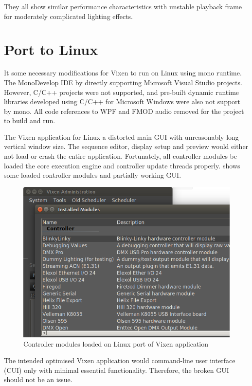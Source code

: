  They all show similar performance characteristics with unstable playback frame  for moderately complicated lighting effects.

\section{Port to Linux}

It  some necessary modifications for Vixen to run on Linux using  mono runtime. The MonoDevelop IDE \cite{monodevelop}  by directly supporting Microsoft Visual Studio projects. However, C/C++ projects were not supported, and pre-built dynamic runtime libraries developed using C/C++ for Microsoft Windows were also not support by mono. All code references to WPF and FMOD audio  removed for the project to build and run.

The  Vixen application for Linux  a distorted main GUI with unreasonably long vertical window size. The sequence editor, display setup and preview would either not load or crash the entire application. Fortunately, all controller modules  be loaded\ca{;} the core execution engine and controller update threads   properly.  shows some loaded controller modules and  partially working GUI.

\begin{figure}[!t]
  \centering
  \includegraphics[width=0.8\columnwidth]{Figs/vixen_linux_controllers.png}
  \caption{\footnotesize Controller modules loaded on Linux port of Vixen application}
  \label{fig:vixen_linux_main}
\end{figure}

The intended optimised Vixen application would  command-line user interface (CUI) only with minimal essential functionality. Therefore, the broken GUI should not be an issue.

